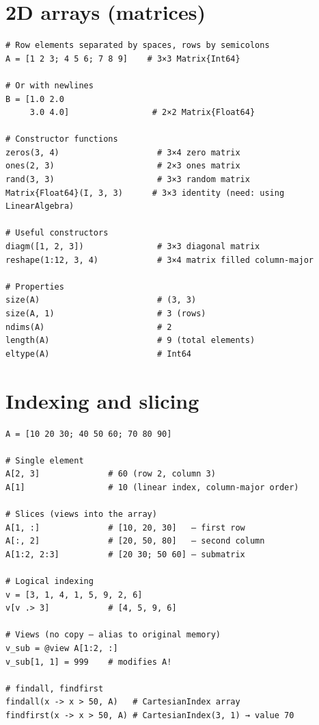 \section{2D arrays (matrices)}

\begin{verbatim}
# Row elements separated by spaces, rows by semicolons
A = [1 2 3; 4 5 6; 7 8 9]    # 3×3 Matrix{Int64}

# Or with newlines
B = [1.0 2.0
     3.0 4.0]                 # 2×2 Matrix{Float64}

# Constructor functions
zeros(3, 4)                    # 3×4 zero matrix
ones(2, 3)                     # 2×3 ones matrix
rand(3, 3)                     # 3×3 random matrix
Matrix{Float64}(I, 3, 3)      # 3×3 identity (need: using LinearAlgebra)

# Useful constructors
diagm([1, 2, 3])               # 3×3 diagonal matrix
reshape(1:12, 3, 4)            # 3×4 matrix filled column-major

# Properties
size(A)                        # (3, 3)
size(A, 1)                     # 3 (rows)
ndims(A)                       # 2
length(A)                      # 9 (total elements)
eltype(A)                      # Int64
\end{verbatim}

\section{Indexing and slicing}

\begin{verbatim}
A = [10 20 30; 40 50 60; 70 80 90]

# Single element
A[2, 3]              # 60 (row 2, column 3)
A[1]                 # 10 (linear index, column-major order)

# Slices (views into the array)
A[1, :]              # [10, 20, 30]   — first row
A[:, 2]              # [20, 50, 80]   — second column
A[1:2, 2:3]          # [20 30; 50 60] — submatrix

# Logical indexing
v = [3, 1, 4, 1, 5, 9, 2, 6]
v[v .> 3]            # [4, 5, 9, 6]

# Views (no copy — alias to original memory)
v_sub = @view A[1:2, :]
v_sub[1, 1] = 999    # modifies A!

# findall, findfirst
findall(x -> x > 50, A)   # CartesianIndex array
findfirst(x -> x > 50, A) # CartesianIndex(3, 1) → value 70
\end{verbatim}

